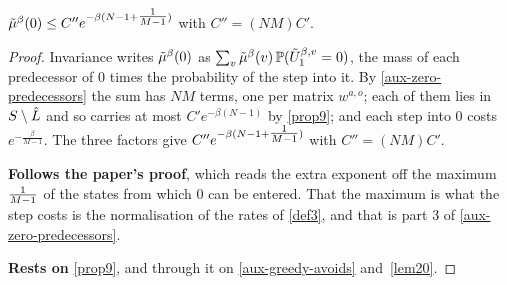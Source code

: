 \begin{corollary}
  \label{cor10}
  \leanok
  $\tilde{\mu}^\beta(0) \le C'' e^{-\beta(N-1+\tfrac{1}{M-1})}$ with $C'' = (NM) C'$.
\end{corollary}
\begin{proof}
  \leanok
  Invariance writes $\tilde{\mu}^\beta(0)$ as $\sum_v \tilde{\mu}^\beta(v)\,
  \mathbb{P}(\tilde{U}^{\beta,v}_1 = 0)$, the mass of each predecessor of $0$ times the
  probability of the step into it.  By
  \ref{aux-zero-predecessors} the sum has $NM$ terms, one per matrix $w^{a,o}$;
  each of them lies in $S \setminus \hat{L}$ and so carries at most
  $C' e^{-\beta(N-1)}$ by \ref{prop9}; and each step into $0$ costs
  $e^{-\frac{\beta}{M-1}}$.  The three factors give
  $C'' e^{-\beta(N-1+\tfrac{1}{M-1})}$ with $C'' = (NM) C'$.

  \textbf{Follows the paper's proof}, which reads the extra exponent off the
  maximum $\tfrac{1}{M-1}$ of the states from which $0$ can be entered.  That the
  maximum is what the step costs is the normalisation of the rates of
  \ref{def3}, and that is part 3 of \ref{aux-zero-predecessors}.

  \textbf{Rests on} \ref{prop9}, and through it on \ref{aux-greedy-avoids}
  and~\ref{lem20}.
\end{proof}

